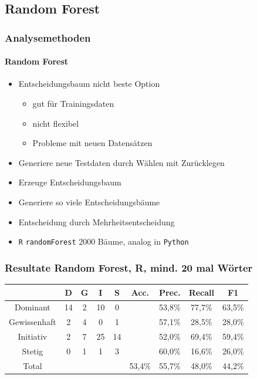 \documentclass{beamer}
\begin{document}
\subsection{Random Forest}
\begin{frame}
\frametitle{Analysemethoden}
\framesubtitle{Random Forest}
\begin{itemize}\setlength\parskip{12pt}
\item Entscheidungsbaum nicht beste Option
\begin{itemize}
	\item gut für Trainingsdaten
	\item nicht flexibel 
	\item Probleme mit neuen Datensätzen
\end{itemize}
\item Generiere neue Testdaten durch Wählen mit Zurücklegen
\item Erzeuge Entscheidungsbaum
\item Generiere so viele Entscheidungsbäume
\item Entscheidung durch Mehrheitsentscheidung
\item \texttt{R} \texttt{randomForest} 2000 Bäume, analog in  \texttt{Python}
\end{itemize}
\end{frame}
\begin{frame}
\frametitle{Resultate Random Forest, R, mind. 20 mal Wörter}
\begin{center}
\begin{tabular}{|c|c|c|c|c|c|c|c|c|}
\hline
 &  D 	& G	& I & S	& Acc.	& Prec. & Recall	& F1\\
\hline
Dominant & 14 & 2 & 10& 0 &&53,8\% & 77,7\% & 63,5\% \\
Gewissenhaft & 2 & 4 & 0 & 1&&57,1\% & 28,5\% & 28,0\% \\
Initiativ & 2 & 7  & 25 & 14&&52,0\% & 69,4\% & 59,4\% \\
Stetig & 0 & 1 & 1 &  3&&60,0\% & 16,6\% & 26,0\% \\
\hline
Total 	&		&		& & 		& 53,4\%		&   55,7\% & 48,0\% & 44,2\%\\
\hline
\end{tabular}
\end{center}
\end{frame}
\end{document}
